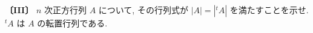 \noindent\textbf{〔III〕}
$n$ 次正方行列 $A$ について, その行列式が $|A|=|{}^{t}\!A|$ を満たすことを示せ.
${}^{t}\!A$ は $A$ の転置行列である.
